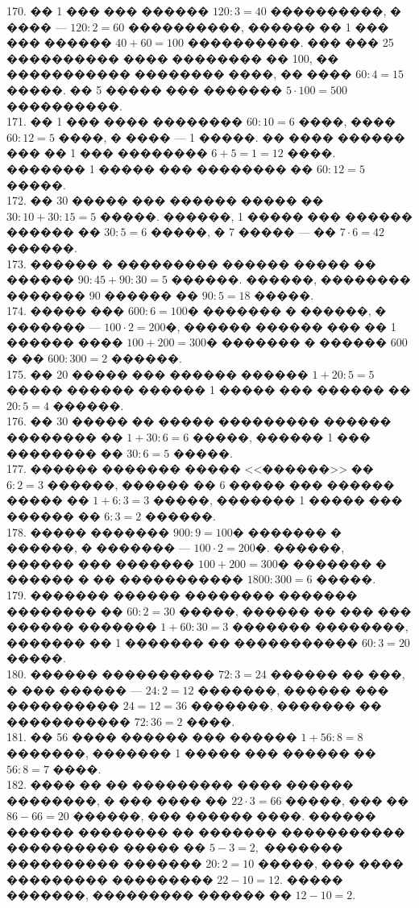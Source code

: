 \documentclass[12pt]{article}
\begin{document}
170. �� 1 ��� ��� ������ $120:3=40$ ����������, � ���� --- $120:2=60$ ����������, ������ �� 1 ��� ��� ������ $40+60=100$ ����������. ��� ��� 25 ���������� ���� �������� �� 100, �� ����������� �������� ����, �� ���� $60:4=15$ �����. �� 5 ����� ��� ������� $5\cdot100=500$ ����������.\\
171. �� 1 ��� ���� �������� $60:10=6$ ����, ���� $60:12=5$ ����, � ���� --- 1 �����. �� ���� ������ ��� �� 1 ��� �������� $6+5=1=12$ ����. ������� 1 ����� ��� �������� �� $60:12=5$ �����.\\
172. �� 30 ����� ��� ������ ����� �� $30:10+30:15=5$ �����. ������, 1 ����� ��� ������ ������ �� $30:5=6$ �����, � 7 ����� --- �� $7\cdot6=42$ ������.\\
173. ������ � ��������� ������ ����� �� ������ $90:45+90:30=5$ ������. ������, �������� ������� 90 ������ �� $90:5=18$ �����.\\
174. ����� ��� $600:6=100$� ������� � ������, � ������� --- $100\cdot2=200$�, ������ ������ ��� �� 1 ������ ���� $100+200=300$� ������� � ������ 600 � �� $600:300=2$ ������.\\
175. �� 20 ����� ��� ������ ������ $1+20:5=5$ ����� ������ ������ 1 ����� ��� ������ �� $20:5=4$ ������.\\
176. �� 30 ����� �� ����� ��������� ������ �������� �� $1+30:6=6$ �����, ������ 1 ��� �������� �� $30:6=5$ �����.\\
177. ������ ������� ����� <<������>> �� $6:2=3$ ������, ������ �� 6 ����� ��� ������ ����� �� $1+6:3=3$ �����, ������� 1 ����� ��� ������ �� $6:3=2$ ������.\\
178. ����� ������� $900:9=100$� ������� � ������, � ������� --- $100\cdot2=200$�. ������, ������ ��� ������� $100+200=300$� ������� � ������ � �� ����������� $1800:300=6$ �����.\\
179. ������� ������ �������� ������� �������� �� $60:2=30$ �����, ������ �� ��� ��� ������ ������� $1+60:30=3$ ������� ��������, ������� �� 1 ������� �� ����������� $60:3=20$ �����.\\
180. ������ ���������� $72:3=24$ ������ �� ���, � ��� ������ --- $24:2=12$ �������, ������ ��� ���������� $24=12=36$ �������, ������� �� ����������� $72:36=2$ ����.\\
181. �� 56 ���� ������ ��� ������ $1+56:8=8$ �������, ������� 1 ����� ��� ������ �� $56:8=7$ ����.\\
182. ���� �� �� ��������� ���� ������ ��������, � ��� ���� �� $22\cdot3=66$ �����, ��� �� $86-66=20$ ������, ��� ������ ����. ������ ������ �������� �� ������� ����������� ���������� ����� �� $5-3=2,$ ������� ���������� ������� $20:2=10$ �����, ��� ���� ��������� ��������� $22-10=12.$ ����� �������, ��������� ������ �� $12-10=2.$\\
\end{document}
